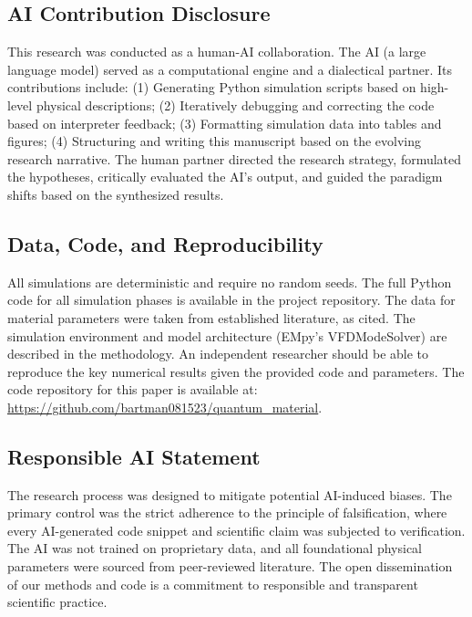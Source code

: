 \documentclass{article}
\begin{document}
\subsection{AI Contribution Disclosure}
This research was conducted as a human-AI collaboration. The AI (a large language model) served as a computational engine and a dialectical partner. Its contributions include: (1) Generating Python simulation scripts based on high-level physical descriptions; (2) Iteratively debugging and correcting the code based on interpreter feedback; (3) Formatting simulation data into tables and figures; (4) Structuring and writing this manuscript based on the evolving research narrative. The human partner directed the research strategy, formulated the hypotheses, critically evaluated the AI's output, and guided the paradigm shifts based on the synthesized results.

\subsection{Data, Code, and Reproducibility}
All simulations are deterministic and require no random seeds. The full Python code for all simulation phases is available in the project repository. The data for material parameters were taken from established literature, as cited. The simulation environment and model architecture (EMpy's VFDModeSolver) are described in the methodology. An independent researcher should be able to reproduce the key numerical results given the provided code and parameters. The code repository for this paper is available at: \href{https://github.com/bartman081523/quantum_material}{https://github.com/bartman081523/quantum\_material}.

\subsection{Responsible AI Statement}
The research process was designed to mitigate potential AI-induced biases. The primary control was the strict adherence to the principle of falsification, where every AI-generated code snippet and scientific claim was subjected to verification. The AI was not trained on proprietary data, and all foundational physical parameters were sourced from peer-reviewed literature. The open dissemination of our methods and code is a commitment to responsible and transparent scientific practice.

\end{document}
